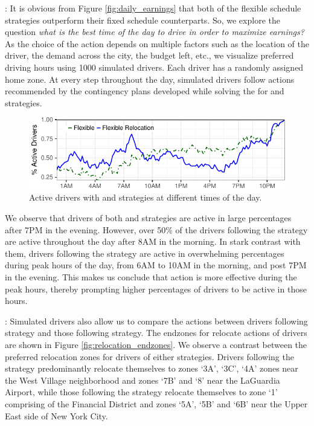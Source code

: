 : It is obvious from Figure \ref{fig:daily_earnings} that both of the flexible schedule strategies outperform their fixed schedule counterparts. So, we explore the question \textit{what is the best time of the day to drive in order to maximize earnings?} As the choice of the {\gohome} action depends on multiple factors such as the location of the driver, the demand across the city, the budget left, etc., we visualize preferred driving hours using 1000 simulated drivers. Each driver has a randomly assigned home zone. At every step throughout the day, simulated drivers follow actions recommended by the contingency plans developed while solving the {\originalproblem} for {\flexible} and {\relocationflexible} strategies.

\begin{figure}[H]
	\centering
	\includegraphics[scale=0.75]{figures/simulated_schedules.pdf}
	\caption{Active drivers with {\flexible} and {\relocationflexible}
	strategies at different times of the day.}
	\label{fig:simulated_schedules}
\end{figure}

We observe that drivers of both {\flexible} and {\relocationflexible} strategies are active in large percentages after 7PM in the evening. However, over 50\% of the drivers following the {\flexible} strategy are active throughout the day after 8AM in the morning. In stark contrast with them, drivers following the {\relocationflexible} strategy are active in overwhelming percentages during peak hours of the day, from 6AM to 10AM in the morning, and post 7PM in the evening. This makes us conclude that {\relocate} action is more effective during the peak hours, thereby prompting higher percentages of {\relocationflexible} drivers to be active in those hours.

:
Simulated drivers also allow us to compare the {\relocate} actions between drivers following {\relocation} strategy and those following {\relocationflexible} strategy. The endzones for relocate actions of drivers are shown in Figure \ref{fig:relocation_endzones}. We observe a contrast between the preferred relocation zones for drivers of either strategies. Drivers following the {\relocation} strategy predominantly relocate themselves to zones `3A', `3C', `4A' zones near the West Village neighborhood and zones `7B' and `8' near the LaGuardia Airport, while those following the {\relocationflexible} strategy relocate themselves to zone `1' comprising of the Financial District and zones `5A', `5B' and `6B' near the Upper East side of New York City.

